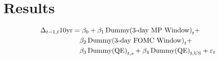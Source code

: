\section{Results}

\begin{align} \notag
    \Delta_{t-1, t} 10\textrm{yr} &= \beta_0 + \beta_1\, \textrm{Dummy(3-day MP Window)}_{t} + \\ \notag
    & \quad \beta_2\, \textrm{Dummy(3-day FOMC Window)}_{t} + \\ \notag
    & \quad \beta_3\, \textrm{Dummy(QE)}_{t,s} + \beta_4 \, \textrm{Dummy(QE)}_{t, \textrm{US}}+\varepsilon_t
\end{align}
